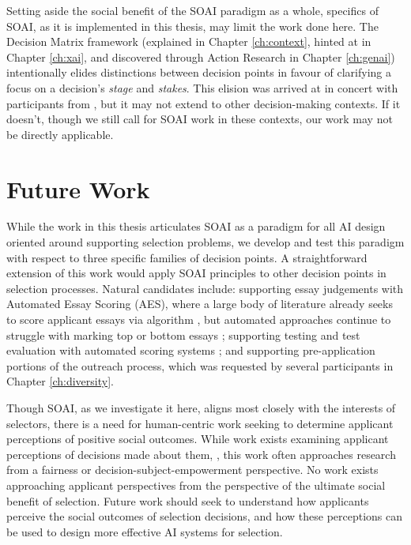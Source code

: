 Setting aside the social benefit of the SOAI paradigm as a whole, specifics of SOAI, as it is implemented in this thesis, may limit the work done here. The Decision Matrix framework (explained in Chapter \ref{ch:context}, hinted at in Chapter \ref{ch:xai}, and discovered through Action Research in Chapter \ref{ch:genai}) intentionally elides distinctions between decision points in favour of clarifying a focus on a decision's \emph{stage} and \emph{stakes}. This elision was arrived at in concert with participants from \rise, but it may not extend to other decision-making contexts. If it doesn't, though we still call for SOAI work in these contexts, our work may not be directly applicable.

\section{Future Work}
While the work in this thesis articulates SOAI as a paradigm for all AI design oriented around supporting selection problems, we develop and test this paradigm with respect to three specific families of decision points. A straightforward extension of this work would apply SOAI principles to other decision points in selection processes. Natural candidates include: supporting essay judgements with Automated Essay Scoring (AES), where a large body of literature already seeks to score applicant essays via algorithm \cite{cozma_automated_2018,ramesh_automated_2022,wang_use_2022,elijahthesis}, but automated approaches continue to struggle with marking top or bottom essays \cite{elijahthesis}; supporting testing and test evaluation with automated scoring systems \cite{organisciak_beyond_2023,condon2014international}; and supporting pre-application portions of the outreach process, which was requested by several participants in Chapter \ref{ch:diversity}.

Though SOAI, as we investigate it here, aligns most closely with the interests of selectors, there is a need for human-centric work seeking to determine applicant perceptions of positive social outcomes. While work exists examining applicant perceptions of decisions made about them, \cite{pandey_applicants_2022,horodyski_applicants_2023}, this work often approaches research from a fairness or decision-subject-empowerment perspective. No work exists approaching applicant perspectives from the perspective of the ultimate social benefit of selection. Future work should seek to understand how applicants perceive the social outcomes of selection decisions, and how these perceptions can be used to design more effective AI systems for selection.


